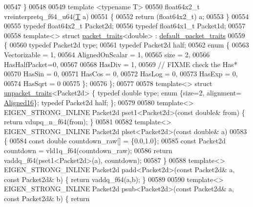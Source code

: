 \begin{DoxyCode}
{{00547 \}
00548 
00549 \textcolor{keyword}{template} <\textcolor{keyword}{typename} T>
00550 float64x2\_t vreinterpretq\_f64\_u64(\hyperlink{group___sparse_core___module}{T} a)
00551 \{
00552   \textcolor{keywordflow}{return} (float64x2\_t) a;
00553 \}
00554 
00555 \textcolor{keyword}{typedef} float64x2\_t Packet2d;
00556 \textcolor{keyword}{typedef} float64x1\_t Packet1d;
00557 
00558 \textcolor{keyword}{template}<> \textcolor{keyword}{struct }\hyperlink{struct_eigen_1_1internal_1_1packet__traits}{packet\_traits}<double>  : \hyperlink{struct_eigen_1_1internal_1_1default__packet__traits}{default\_packet\_traits}
00559 \{
00560   \textcolor{keyword}{typedef} Packet2d type;
00561   \textcolor{keyword}{typedef} Packet2d half;
00562   \textcolor{keyword}{enum} \{
00563     Vectorizable = 1,
00564     AlignedOnScalar = 1,
00565     size = 2,
00566     HasHalfPacket=0,
00567    
00568     HasDiv  = 1,
00569     \textcolor{comment}{// FIXME check the Has*}
00570     HasSin  = 0,
00571     HasCos  = 0,
00572     HasLog  = 0,
00573     HasExp  = 0,
00574     HasSqrt = 0
00575   \};
00576 \};
00577 
00578 \textcolor{keyword}{template}<> \textcolor{keyword}{struct }\hyperlink{struct_eigen_1_1internal_1_1unpacket__traits}{unpacket\_traits}<Packet2d> \{ \textcolor{keyword}{typedef} \textcolor{keywordtype}{double}  type; \textcolor{keyword}{enum} \{size=2, alignment=
      \hyperlink{group__enums_gga45fe06e29902b7a2773de05ba27b47a1af8e2bf74b04c02199f62c5e3c06dbfcc}{Aligned16}\}; \textcolor{keyword}{typedef} Packet2d half; \};
00579 
00580 \textcolor{keyword}{template}<> EIGEN\_STRONG\_INLINE Packet2d pset1<Packet2d>(\textcolor{keyword}{const} \textcolor{keywordtype}{double}&  from) \{ \textcolor{keywordflow}{return} vdupq\_n\_f64(from); \}
00581 
00582 \textcolor{keyword}{template}<> EIGEN\_STRONG\_INLINE Packet2d plset<Packet2d>(\textcolor{keyword}{const} \textcolor{keywordtype}{double}& a)
00583 \{
00584   \textcolor{keyword}{const} \textcolor{keywordtype}{double} countdown\_raw[] = \{0.0,1.0\};
00585   \textcolor{keyword}{const} Packet2d countdown = vld1q\_f64(countdown\_raw);
00586   \textcolor{keywordflow}{return} vaddq\_f64(pset1<Packet2d>(a), countdown);
00587 \}
00588 \textcolor{keyword}{template}<> EIGEN\_STRONG\_INLINE Packet2d padd<Packet2d>(\textcolor{keyword}{const} Packet2d& a, \textcolor{keyword}{const} Packet2d& b) \{ \textcolor{keywordflow}{return} 
      vaddq\_f64(a,b); \}
00589 
00590 \textcolor{keyword}{template}<> EIGEN\_STRONG\_INLINE Packet2d psub<Packet2d>(\textcolor{keyword}{const} Packet2d& a, \textcolor{keyword}{const} Packet2d& b) \{ \textcolor{keywordflow}{return} 
}}
\end{DoxyCode}
